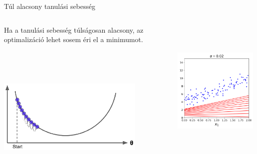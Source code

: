 \documentclass[english, aspectratio=169]{beamer}
\begin{document}
\begin{frame}{Túl alacsony tanulási sebesség}
\begin{columns}
\begin{column}{.5\textwidth}
Ha a tanulási sebesség túlságosan alacsony, az optimalizáció lehet sosem éri el a minimumot.
\begin{center}
\includegraphics[width=7cm, height=7cm, keepaspectratio]{images/regresszio_21.png}
\end{center}
\end{column}
\begin{column}{.5\textwidth}
\begin{center}
\includegraphics[width=7cm, height=7cm, keepaspectratio]{images/regresszio_24.png}
\end{center}
\end{column}
\end{columns}
\end{frame}
\end{document}
